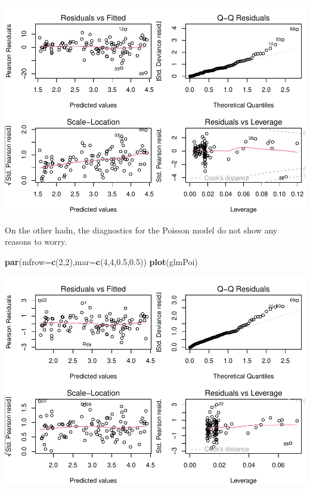 \documentclass[
]{book}
\newenvironment{Shaded}{\begin{snugshade}}{\end{snugshade}}
\newcommand{\DataTypeTok}[1]{\textcolor[rgb]{0.13,0.29,0.53}{#1}}
\newcommand{\DecValTok}[1]{\textcolor[rgb]{0.00,0.00,0.81}{#1}}
\newcommand{\FloatTok}[1]{\textcolor[rgb]{0.00,0.00,0.81}{#1}}
\newcommand{\KeywordTok}[1]{\textcolor[rgb]{0.13,0.29,0.53}{\textbf{#1}}}
\newcommand{\NormalTok}[1]{#1}
\begin{document}
\includegraphics{ECOMODbook_files/figure-latex/glm6-1.pdf}

On the other hadn, the diagnostics for the Poisson model do not show any reasons to worry.

\begin{Shaded}
\begin{Highlighting}[]
\KeywordTok{par}\NormalTok{(}\DataTypeTok{mfrow=}\KeywordTok{c}\NormalTok{(}\DecValTok{2}\NormalTok{,}\DecValTok{2}\NormalTok{),}\DataTypeTok{mar=}\KeywordTok{c}\NormalTok{(}\DecValTok{4}\NormalTok{,}\DecValTok{4}\NormalTok{,}\FloatTok{0.5}\NormalTok{,}\FloatTok{0.5}\NormalTok{))}
\KeywordTok{plot}\NormalTok{(glmPoi)}
\end{Highlighting}
\end{Shaded}

\includegraphics{ECOMODbook_files/figure-latex/glm7-1.pdf}
\end{document}
